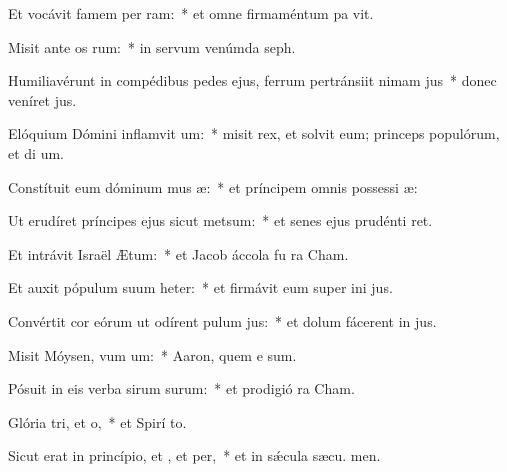 \item Et vocávit famem per ram:~* et omne firmaméntum pa vit.
\item Misit ante os rum:~* in servum venúmda  seph.
\item Humiliavérunt in compédibus pedes ejus, ferrum pertránsiit nimam jus~* donec veníret  jus.
\item Elóquium Dómini inflamvit um:~* misit rex, et solvit eum; princeps populórum, et di um.
\item Constítuit eum dóminum mus æ:~* et príncipem omnis possessi æ:
\item Ut erudíret príncipes ejus sicut metsum:~* et senes ejus prudénti ret.
\item Et intrávit Israël  Ætum:~* et Jacob áccola fu  ra Cham.
\item Et auxit pópulum suum heter:~* et firmávit eum super ini jus.
\item Convértit cor eórum ut odírent pulum jus:~* et dolum fácerent in  jus.
\item Misit Móysen, vum um:~* Aaron, quem e sum.
\item Pósuit in eis verba sirum surum:~* et prodigió  ra Cham.
\item Glória tri, et o,~* et Spirí to.
\item Sicut erat in princípio, et , et per,~* et in sǽcula sæcu. men.
